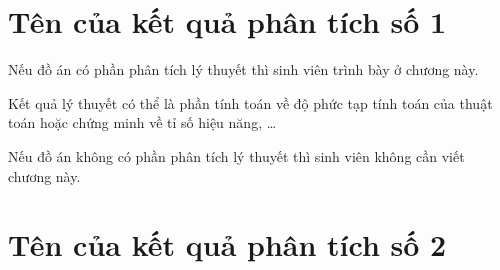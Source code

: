 
\section{Tên của kết quả phân tích số 1}

Nếu đồ án có phần phân tích lý thuyết thì sinh viên trình bày ở chương này. 

Kết quả lý thuyết có thể là phần tính toán về độ phức tạp tính toán của thuật toán hoặc chứng minh về tỉ số hiệu năng, \ldots

Nếu đồ án không có phần phân tích lý thuyết thì sinh viên không cần viết chương này. 

\section{Tên của kết quả phân tích số 2}
